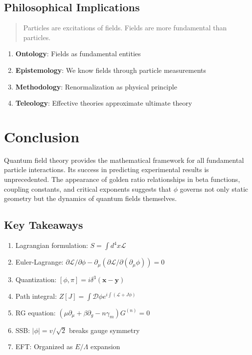 \subsection{Philosophical Implications}

\begin{quote}
Particles are excitations of fields. Fields are more fundamental than particles.
\end{quote}

\begin{enumerate}
\item \textbf{Ontology}: Fields as fundamental entities
\item \textbf{Epistemology}: We know fields through particle measurements
\item \textbf{Methodology}: Renormalization as physical principle
\item \textbf{Teleology}: Effective theories approximate ultimate theory
\end{enumerate}

\section{Conclusion}

Quantum field theory provides the mathematical framework for all fundamental particle interactions. Its success in predicting experimental results is unprecedented. The appearance of golden ratio relationships in beta functions, coupling constants, and critical exponents suggests that $\phi$ governs not only static geometry but the dynamics of quantum fields themselves.

\subsection*{Key Takeaways}

\begin{enumerate}
\item Lagrangian formulation: $S = \int d^4x \mathcal{L}$
\item Euler-Lagrange: $\partial\mathcal{L}/\partial\phi - \partial_\mu(\partial\mathcal{L}/\partial(\partial_\mu\phi)) = 0$
\item Quantization: $[\phi, \pi] = i\delta^3(\mathbf{x}-\mathbf{y})$
\item Path integral: $Z[J] = \int \mathcal{D}\phi e^{i\int(\mathcal{L} + J\phi)}$
\item RG equation: $(\mu\partial_\mu + \beta\partial_g - n\gamma_m)G^{(n)} = 0$
\item SSB: $|\phi| = v/\sqrt{2}$ breaks gauge symmetry
\item EFT: Organized as $E/\Lambda$ expansion
\end{enumerate}

